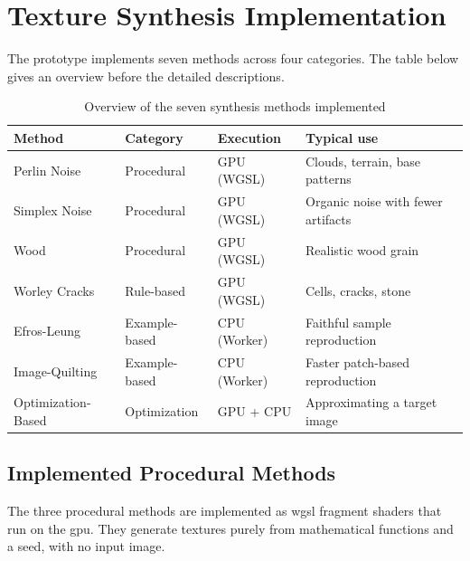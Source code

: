 \section{Texture Synthesis Implementation}

The prototype implements seven methods across four categories. The table below gives an overview before the detailed descriptions.

\begin{table}[H]
    \centering
    \caption{Overview of the seven synthesis methods implemented}
    \label{tab:method-overview}
    \begin{tabularx}{\textwidth}{|l|l|l|X|}
    \hline
    \textbf{Method} & \textbf{Category} & \textbf{Execution} & \textbf{Typical use} \\
    \hline
    \hline
    
    Perlin Noise & Procedural & GPU (WGSL) & Clouds, terrain, base patterns \\
    \hline

    Simplex Noise & Procedural & GPU (WGSL) & Organic noise with fewer artifacts \\
    \hline

    Wood & Procedural & GPU (WGSL) & Realistic wood grain \\
    \hline

    Worley Cracks & Rule-based & GPU (WGSL) & Cells, cracks, stone \\
    \hline

    Efros-Leung & Example-based & CPU (Worker) & Faithful sample reproduction \\
    \hline

    Image-Quilting & Example-based & CPU (Worker) & Faster patch-based reproduction \\
    \hline

    Optimization-Based & Optimization & GPU + CPU & Approximating a target image \\
    \hline
    
    \end{tabularx}
\end{table}

\subsection{Implemented Procedural Methods}

The three procedural methods are implemented as \gls{wgsl} fragment shaders that run on the \gls{gpu}. They generate textures purely from mathematical functions and a seed, with no input image.


